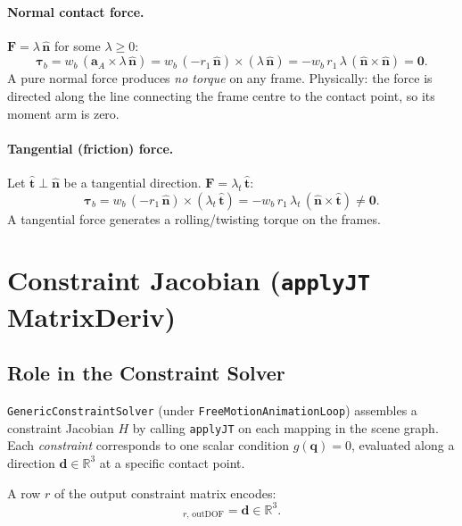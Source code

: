 \documentclass[11pt, a4paper]{article}
\newcommand{\vv}[1]{\bm{#1}}
\newcommand{\nn}{\hat{\vv{n}}}
\begin{document}
\paragraph{Normal contact force.}
$\vv{F} = \lambda\,\nn$ for some $\lambda \geq 0$:
\begin{equation}
  \bm{\tau}_b
  = w_b\,(\vv{a}_A \times \lambda\,\nn)
  = w_b\,(-r_1\,\nn) \times (\lambda\,\nn)
  = -w_b\,r_1\,\lambda\,(\nn \times \nn)
  = \vv{0}.
  \label{eq:normal_torque}
\end{equation}
A pure normal force produces \emph{no torque} on any frame.
Physically: the force is directed along the line connecting the
frame centre to the contact point, so its moment arm is zero.

\paragraph{Tangential (friction) force.}
Let $\hat{\vv{t}} \perp \nn$ be a tangential direction.
$\vv{F} = \lambda_t\,\hat{\vv{t}}$:
\begin{equation}
  \bm{\tau}_b
  = w_b\,(-r_1\,\nn) \times (\lambda_t\,\hat{\vv{t}})
  = -w_b\,r_1\,\lambda_t\,(\nn \times \hat{\vv{t}})
  \neq \vv{0}.
  \label{eq:tangential_torque}
\end{equation}
A tangential force generates a rolling/twisting torque on the frames.

\section{Constraint Jacobian (\texttt{applyJT} MatrixDeriv)}
\label{sec:constraint}

\subsection{Role in the Constraint Solver}

\texttt{GenericConstraintSolver} (under \texttt{FreeMotionAnimationLoop})
assembles a constraint Jacobian $H$ by calling \texttt{applyJT} on each
mapping in the scene graph. Each \emph{constraint} corresponds to one
scalar condition $g(\vv{q}) = 0$, evaluated along a direction
$\vv{d} \in \mathbb{R}^3$ at a specific contact point.

A row $r$ of the output constraint matrix encodes:
\begin{equation}
  [\text{OutMatrixDeriv}]_{r,\,\text{outDOF}}
  = \vv{d} \in \mathbb{R}^3.
  \label{eq:out_constraint_row}
\end{equation}
\end{document}
